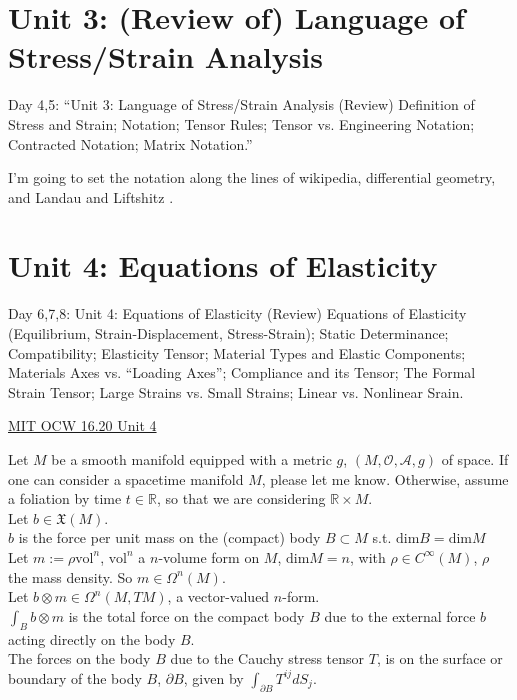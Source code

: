 \documentclass[twoside,landscape,10pt]{amsart}
\theoremstyle{plain}
\theoremstyle{definition}
\theoremstyle{remark}
\begin{document}
\begin{multicols*}{2}
\section*{Unit 3: (Review of) Language of Stress/Strain Analysis}

Day 4,5: ``Unit 3: Language of Stress/Strain Analysis (Review)
Definition of Stress and Strain; Notation; Tensor Rules; Tensor vs. Engineering Notation; Contracted Notation; Matrix Notation.''

I'm going to set the notation along the lines of wikipedia, differential geometry, and Landau and Liftshitz \cite{LLandauELifshitz1970}.  

\section*{Unit 4: Equations of Elasticity}

Day 6,7,8: Unit 4: Equations of Elasticity (Review)
Equations of Elasticity (Equilibrium, Strain-Displacement, Stress-Strain); Static Determinance; Compatibility; Elasticity Tensor; Material Types and Elastic Components; Materials Axes vs. ``Loading Axes''; Compliance and its Tensor; The Formal Strain Tensor; Large Strains vs. Small Strains; Linear vs. Nonlinear Srain.

\href{http://ocw.mit.edu/courses/aeronautics-and-astronautics/16-20-structural-mechanics-fall-2002/lecture-notes/unit4.pdf}{MIT OCW 16.20 Unit 4}

Let $M$ be a smooth manifold equipped with a metric $g$, $(M,\mathcal{O},\mathcal{A},g)$ of space.  If one can consider a spacetime manifold $M$, please let me know.  Otherwise, assume a foliation by time $t\in \mathbb{R}$, so that we are considering $\mathbb{R}\times M$.  \\
Let $b \in \mathfrak{X}(M)$. \\
\phantom{Let} $b$ is the force per unit mass on the (compact) body $B\subset M$ s.t. $\text{dim}B = \text{dim}M$  \\
Let $m:= \rho \text{vol}^n$, $\text{vol}^n$ a $n$-volume form on $M$, $\text{dim}M=n$, with $\rho \in C^{\infty}(M)$, $\rho$ the mass density.  So $m\in \Omega^n(M)$.  \\
Let $b\otimes m \in \Omega^n(M,TM)$, a vector-valued $n$-form.  \\
$\int_B b\otimes m$ is the total force on the compact body $B$ due to the external force $b$ acting directly on the body $B$.  \\
The forces on the body $B$ due to the Cauchy stress tensor $T$, is on the surface or boundary of the body $B$, $\partial B$, given by $\int_{\partial B} T^{ij} dS_j$.  


\end{multicols*}
\end{document}
